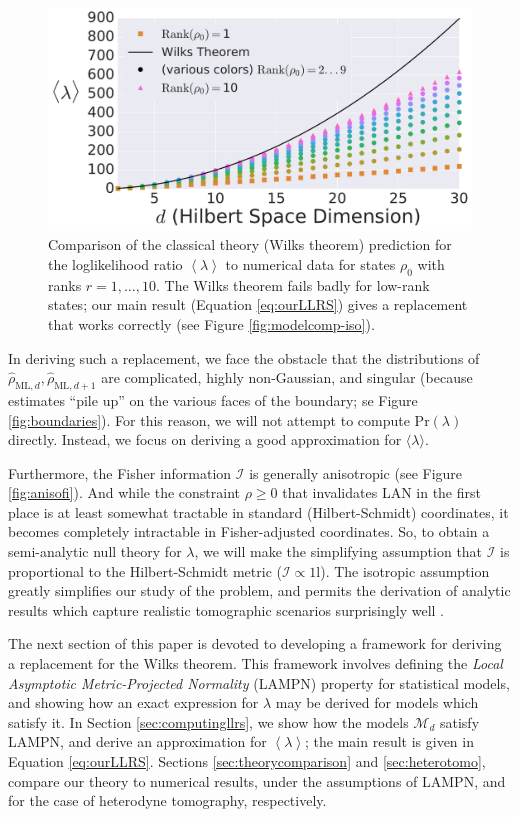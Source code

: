 \documentclass[aps,pra, twocolumn]{revtex4-1}
\newcommand{\M}{\mathcal{M}}
\newcommand{\Id}{\mathbb{I}}
\newcommand{\expect}[1]{\ensuremath{\left\langle#1\right\rangle}}
\def\Id{1\!\mathrm{l}}
\newcommand{\rhohat}{\hat{\rho}}
\newcommand{\rhoML}[1]{\rhohat_{\scriptscriptstyle{\mathrm{ML},#1}}}
\begin{document}
\begin{figure}
\includegraphics[width=\columnwidth]{Images/Figure_2A.pdf}
 \caption{Comparison of the classical theory (Wilks theorem) prediction for the loglikelihood ratio $\expect{\lambda}$ to numerical data for states $\rho_{0}$ with ranks $r=1,\ldots ,10$.  The Wilks theorem fails badly for low-rank states; our main result (Equation \ref{eq:ourLLRS}) gives a replacement that works correctly (see Figure \ref{fig:modelcomp-iso}).}
\label{fig:boundaries2}
\end{figure}

In deriving such a replacement, we face the obstacle that the distributions of $\rhoML{d}, \rhoML{d+1}$ are complicated, highly non-Gaussian, and singular (because estimates ``pile up'' on the various faces of the boundary; se Figure \ref{fig:boundaries}).  For this reason, we will not attempt to compute $\mathrm{Pr}(\lambda)$ directly.  Instead, we focus on deriving a good approximation for $\langle \lambda \rangle$.

Furthermore, the Fisher information $\mathcal{I}$ is generally anisotropic (see Figure \ref{fig:anisofi}). And while the constraint $\rho\geq0$ that invalidates LAN in the first place is at least somewhat tractable in standard (Hilbert-Schmidt) coordinates, it becomes completely intractable in Fisher-adjusted coordinates.  So, to obtain a semi-analytic null theory for $\lambda$, we will make the simplifying assumption that $\mathcal{I}$ is proportional to the Hilbert-Schmidt metric ($\mathcal{I} \propto \Id$). The isotropic assumption greatly simplifies our study of
the problem, and permits the derivation of analytic results which capture realistic tomographic scenarios surprisingly well \cite{Smolin2012}.

The next section of this paper is devoted to developing a framework for deriving a replacement for the Wilks theorem. This framework involves defining the \emph{Local Asymptotic Metric-Projected Normality} (LAMPN) property for statistical models, and showing how an exact expression for $\lambda$ may be derived for models which satisfy it. In Section \ref{sec:computingllrs}, we show how the models $\M_{d}$ satisfy LAMPN, and derive an approximation for $\expect{\lambda}$; the main result is given in Equation \eqref{eq:ourLLRS}.  Sections \ref{sec:theorycomparison} and \ref{sec:heterotomo}, compare our theory to numerical results, under the assumptions of LAMPN, and for the case of heterodyne tomography, respectively.
\end{document}
